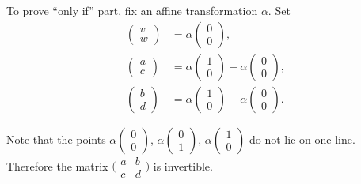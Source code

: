 To prove ``only if'' part,
fix an affine transformation $\alpha$.
Set 
\begin{align*}
\left(\begin{smallmatrix}
v\\ w
\end{smallmatrix} \right)
&= 
\alpha\left(\begin{smallmatrix}
0\\ 0
\end{smallmatrix} \right),
\\
\left(\begin{smallmatrix}
a\\ c
\end{smallmatrix} \right)
&=
\alpha\left(\begin{smallmatrix}
1\\ 0
\end{smallmatrix} \right)
-
\alpha\left(\begin{smallmatrix}
0\\ 0
\end{smallmatrix} \right),
\\
\left(\begin{smallmatrix}
b\\ d
\end{smallmatrix} \right)
&=
\alpha\left(\begin{smallmatrix}
1\\ 0
\end{smallmatrix} \right)
-
\alpha\left(\begin{smallmatrix}
0\\ 0
\end{smallmatrix} \right).
\end{align*}


Note that the points 
$\alpha\left(\begin{smallmatrix}
0\\ 0
\end{smallmatrix} \right)$, 
$\alpha\left(\begin{smallmatrix}
0\\ 1
\end{smallmatrix} \right)$, 
$\alpha\left(\begin{smallmatrix}
1\\ 0
\end{smallmatrix} \right)$ do not lie on one line. 
Therefore the matrix $\bigl(\begin{smallmatrix}
a&b\\ c&d
\end{smallmatrix} \bigr)$
is invertible.


